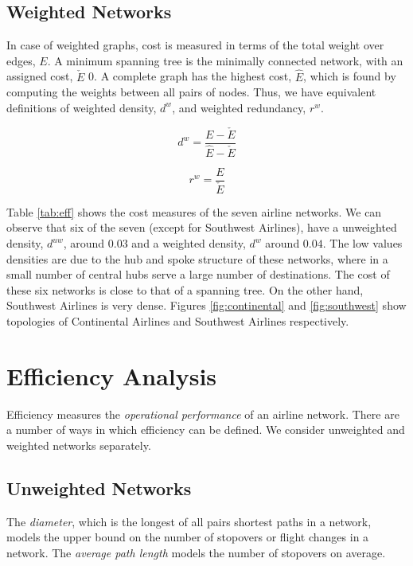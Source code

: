 \documentclass[10pt]{article}
\begin{document}
\subsection{Weighted Networks}

In case of weighted graphs, cost is measured in terms of the total weight over edges, $E$. A minimum spanning tree is the minimally connected network, with an assigned cost, $\check{E}$ 0. A complete graph has the highest cost, $\hat{E}$, which is found by computing the weights between all pairs of nodes. Thus, we have equivalent definitions of weighted density, $d^{w}$, and weighted redundancy, $r^{w}$.

\[d^{w} = \frac{E - \check{E}}{\hat{E} - \check{E}}\]

\[r^{w} = \frac{E}{\check{E}}\]

Table \ref{tab:eff} shows the cost measures of the seven airline networks. We can observe that six of the seven (except for Southwest Airlines), have a unweighted density, $d^{uw}$, around $0.03$ and a weighted density, $d^{w}$ around $0.04$. The low values densities are due to the hub and spoke structure of these networks, where in  a small number of central hubs serve a large number of destinations. The cost of these six networks is close to that of a spanning tree. On the other hand, Southwest Airlines is very dense. Figures \ref{fig:continental} and \ref{fig:southwest} show topologies of Continental Airlines and Southwest Airlines respectively.

\section{Ef\mbox{}f\mbox{}iciency Analysis}\label{sec:efficiency}

Efficiency measures the \textit{operational performance} of an airline network. There are a number of ways in which efficiency can be defined. We consider unweighted and weighted networks separately.

\subsection{Unweighted Networks}

The \textit{diameter}, which is the longest of all pairs shortest paths in a network, models the upper bound on the  %
number of stopovers or flight changes in a network.
The \textit{average path length} %
models the number of stopovers on average.
\end{document}
